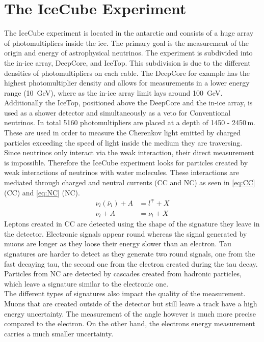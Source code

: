 \section{The IceCube Experiment}
\label{sec:The_IceCube_Experiment}
The IceCube experiment is located in the antarctic and consists of a huge array of photomultipliers inside the ice. 
The primary goal is the measurement of the origin and energy of astrophysical neutrinos.
The experiment is subdivided into the in-ice array, DeepCore, and IceTop. 
This subdivision is due to the different densities of photomultipliers on each cable. 
The DeepCore for example has the highest photomultiplier density and allows for measurements in a lower energy 
range (\qty{10}{\giga\eV}), where as the in-ice array limit lays around \qty{100}{\giga\eV}.
Additionally the IceTop, positioned above the DeepCore and the in-ice array, 
is used as a shower detector and simultaneously as a veto for Conventional neutrinos.
In total 5160 photomultipliers are placed at a depth of 1450 - 2450\,\unit{\meter}. 
These are used in order to measure the Cherenkov light emitted by charged particles exceeding the speed of light inside the medium they are traversing. \\

Since neutrinos only interact via the weak interaction, their direct measurement is impossible. 
Therefore the IceCube experiment looks for particles created by weak interactions of neutrinos with water molecules. 
These interactions are mediated through charged and neutral currents (CC and NC) as seen in \autoref{eq:CC} (CC) and \autoref{eq:NC} (NC).
\begin{align}
	\nu_l(\bar{\nu}_l) + A &= l^\mp + X \label{eq:CC}\\
	\nu_l + A &= \nu_l + X \label{eq:NC}	
\end{align}
Leptons created in CC are detected using the shape of the signature they leave in the detector. 
Electronic signals appear round whereas the signal generated by muons
are longer as they loose their energy slower than an electron. 
Tau signatures are harder to detect as they generate two round signals, 
one from the fast decaying tau, the second one from the electron created during the tau decay.
Particles from NC are detected by cascades created from hadronic particles, 
which leave a signature similar to the electronic one.\\

The different types of signatures also impact the quality of the measurement. Muons that are created outside of the detector but still leave a track have a high energy uncertainty. The measurement of the angle however is much more precise compared to the electron. On the other hand, the electrons energy measurement carries a much smaller uncertainty.\\


